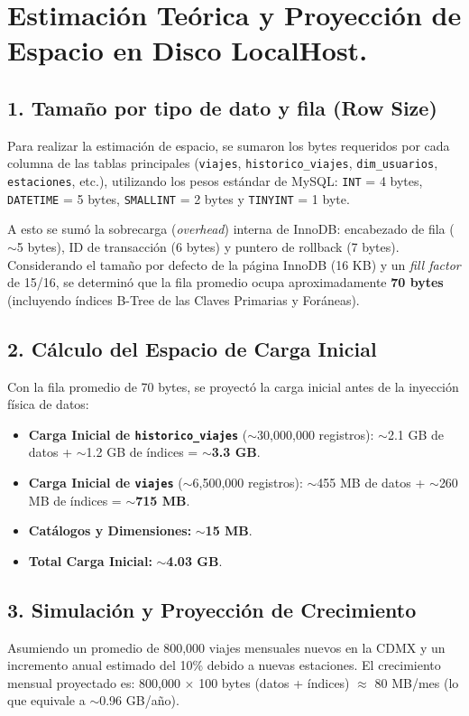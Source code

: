 \documentclass[10pt,a4paper]{article}
\begin{document}
\newpage 
\section{Estimación Teórica y Proyección de Espacio en Disco LocalHost.}
\subsection{1. Tamaño por tipo de dato y fila (Row Size)}
Para realizar la estimación de espacio, se sumaron los bytes requeridos por cada columna de las tablas principales (\texttt{viajes}, \texttt{historico\_viajes}, \texttt{dim\_usuarios}, \texttt{estaciones}, etc.), utilizando los pesos estándar de MySQL: \texttt{INT} = 4 bytes, \texttt{DATETIME} = 5 bytes, \texttt{SMALLINT} = 2 bytes y \texttt{TINYINT} = 1 byte.

A esto se sumó la sobrecarga (\textit{overhead}) interna de InnoDB: encabezado de fila ($\sim$5 bytes), ID de transacción (6 bytes) y puntero de rollback (7 bytes). Considerando el tamaño por defecto de la página InnoDB (16 KB) y un \textit{fill factor} de 15/16, se determinó que la fila promedio ocupa aproximadamente \textbf{70 bytes} (incluyendo índices B-Tree de las Claves Primarias y Foráneas).

\subsection{2. Cálculo del Espacio de Carga Inicial}
Con la fila promedio de 70 bytes, se proyectó la carga inicial antes de la inyección física de datos:
\begin{itemize}
    \item \textbf{Carga Inicial de \texttt{historico\_viajes}} ($\sim$30,000,000 registros): $\sim$2.1 GB de datos + $\sim$1.2 GB de índices = \textbf{$\sim$3.3 GB}.
    \item \textbf{Carga Inicial de \texttt{viajes}} ($\sim$6,500,000 registros): $\sim$455 MB de datos + $\sim$260 MB de índices = \textbf{$\sim$715 MB}.
    \item \textbf{Catálogos y Dimensiones:} \textbf{$\sim$15 MB}.
    \item \textbf{Total Carga Inicial:} \textbf{$\sim$4.03 GB}.
\end{itemize}

\subsection{3. Simulación y Proyección de Crecimiento}
Asumiendo un promedio de 800,000 viajes mensuales nuevos en la CDMX y un incremento anual estimado del 10\% debido a nuevas estaciones. El crecimiento mensual proyectado es: 800,000 $\times$ 100 bytes (datos + índices) $\approx$ 80 MB/mes (lo que equivale a $\sim$0.96 GB/año).
\end{document}
